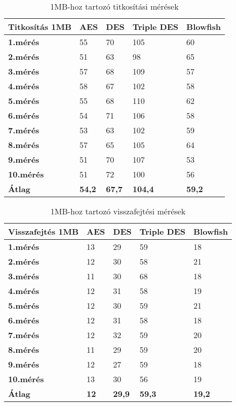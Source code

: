 
\begin{table}[H]
	\centering
	\caption{1MB-hoz tartozó titkosítási mérések}
	\label{tab:enc_1mb}
	\medskip
	\begin{tabular}{|p{2.4cm}|p{2cm}|p{2cm}|p{2cm}|p{2cm}|}
		\hline
		\textbf{Titkosítás} \newline \textbf{1MB} & \textbf{AES} & \textbf{DES} & \textbf{Triple DES} & \textbf{Blowfish}\\
		\hline
		\textbf{1.mérés} & 55 & 70 & 105 & 60\\
		\hline
		\textbf{2.mérés} & 51 & 63 & 98 & 65\\
		\hline
		\textbf{3.mérés} & 57 & 68 & 109 & 57\\
		\hline
		\textbf{4.mérés} & 58 & 67 & 102 & 58\\
		\hline
		\textbf{5.mérés} & 55 & 68 & 110 & 62\\
		\hline
		\textbf{6.mérés} & 54 & 71 & 106 & 58\\
		\hline
		\textbf{7.mérés} & 53 & 63 & 102 & 59\\
		\hline
		\textbf{8.mérés} & 57 & 65 & 105 & 64\\
		\hline
		\textbf{9.mérés} & 51 & 70 & 107 & 53\\
		\hline
		\textbf{10.mérés} & 51 & 72 & 100 & 56\\
		\hline
		\hline
		\textbf{Átlag} & \textbf{54,2} & \textbf{67,7} &\textbf{ 104,4} & \textbf{59,2}\\
		\hline
	\end{tabular}
\end{table}

\begin{table}[H]
	\centering
	\caption{1MB-hoz tartozó visszafejtési mérések}
	\label{tab:dec_1mb}
	\medskip
	\begin{tabular}{|p{2.4cm}|p{2cm}|p{2cm}|p{2cm}|p{2cm}|}
		\hline
		\textbf{Visszafejtés} \newline \textbf{1MB} & \textbf{AES} & \textbf{DES} & \textbf{Triple DES} & \textbf{Blowfish}\\
		\hline
		\textbf{1.mérés} & 13 & 29 & 59 & 18\\
		\hline
		\textbf{2.mérés} & 12 & 30 & 58 & 21\\
		\hline
		\textbf{3.mérés} & 11 & 30 & 68 & 18\\
		\hline
		\textbf{4.mérés} & 12 & 31 & 58 & 19\\
		\hline
		\textbf{5.mérés} & 12 & 30 & 59 & 21\\
		\hline
		\textbf{6.mérés} & 12 & 31 & 58 & 18\\
		\hline
		\textbf{7.mérés} & 12 & 32 & 59 & 20\\
		\hline
		\textbf{8.mérés} & 11 & 29 & 59 & 20\\
		\hline
		\textbf{9.mérés} & 12 & 27 & 59 & 18\\
		\hline
		\textbf{10.mérés} & 13 & 30 & 56 & 19\\
		\hline
		\hline
		\textbf{Átlag} & \textbf{12} & \textbf{29,9} & \textbf{59,3} & \textbf{19,2}\\
		\hline
	\end{tabular}
\end{table}

